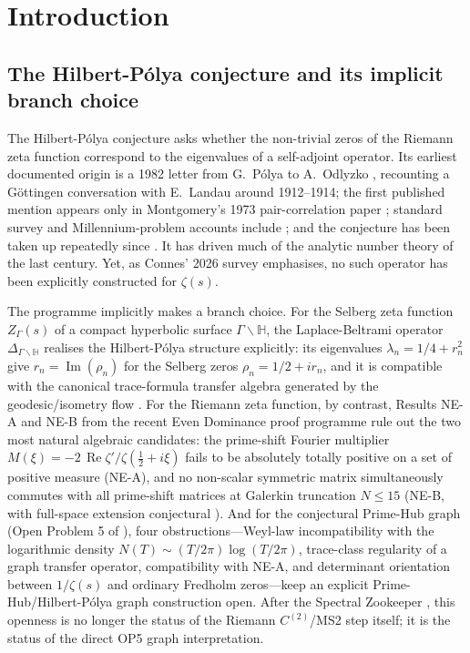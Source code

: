 \documentclass[11pt]{article}
\theoremstyle{definition}
\theoremstyle{remark}
\renewcommand{\Re}{\operatorname{Re}}
\newcommand{\halfline}{\tfrac{1}{2}}
\newcommand{\zer}[1]{\zeta'/\zeta(#1)}
\begin{document}
\clearpage
\tableofcontents
\clearpage

\section{Introduction}
\label{sec:intro}

\subsection{The Hilbert-P\'olya conjecture and its implicit branch
choice}
\label{sec:hp-implicit-branch}

The Hilbert-P\'olya conjecture asks whether the non-trivial zeros of
the Riemann zeta function correspond to the eigenvalues of a
self-adjoint operator. Its earliest documented origin is a 1982 letter
from G.~P\'olya to A.~Odlyzko \cite{Polya1982letter}, recounting a
Göttingen conversation with E.~Landau around 1912--1914; the first
published mention appears only in Montgomery's 1973 pair-correlation
paper \cite{Montgomery1973}; standard survey and Millennium-problem
accounts include \cite{Bombieri2000,Conrey2003}; and the conjecture
has been taken up repeatedly since
\cite{Berry1985, BerryKeating1999, KeatingSnaith2000, Connes1999}. It
has driven much of the analytic number theory of the last century.
Yet, as Connes' 2026 survey \cite{Connes2026} emphasises, no such
operator has been explicitly constructed for $\zeta(s)$.

The programme implicitly makes a branch choice. For the Selberg zeta
function $Z_\Gamma(s)$ of a compact hyperbolic surface
$\Gamma\backslash\mathbb{H}$, the Laplace-Beltrami operator
$\Delta_{\Gamma\backslash\mathbb{H}}$ realises the Hilbert-P\'olya
structure explicitly: its eigenvalues $\lambda_n = 1/4 + r_n^2$ give
$r_n = \operatorname{Im}(\rho_n)$ for the Selberg zeros $\rho_n =
1/2 + ir_n$, and it is compatible with the canonical trace-formula
transfer algebra generated by the geodesic/isometry flow
\cite{Selberg1956}. For the Riemann zeta function, by contrast,
Results NE-A and NE-B from the recent Even Dominance proof programme
\cite{Geiger2026RHII} rule out the two most natural algebraic
candidates: the prime-shift Fourier multiplier
$M(\xi) = -2\,\Re\zer{\halfline + i\xi}$ fails to be absolutely
totally positive on a set of positive measure (NE-A), and no
non-scalar symmetric matrix simultaneously commutes with all
prime-shift matrices at Galerkin truncation $N\leq 15$ (NE-B, with
full-space extension conjectural \cite{Geiger2026RHII}). And for the
conjectural Prime-Hub graph (Open Problem 5 of
\cite{Geiger2026RHIII}), four obstructions---Weyl-law incompatibility
with the logarithmic density $N(T)\sim (T/2\pi)\log(T/2\pi)$, trace-class
regularity of a graph transfer operator, compatibility with NE-A,
and determinant orientation between $1/\zeta(s)$ and ordinary
Fredholm zeros---keep an explicit Prime-Hub/Hilbert-P\'olya graph construction
open.  After the Spectral Zookeeper \cite{Zookeeper2026}, this
openness is no longer the status of the Riemann $C^{(2)}$/MS2 step
itself; it is the status of the direct OP5 graph interpretation.
\end{document}
